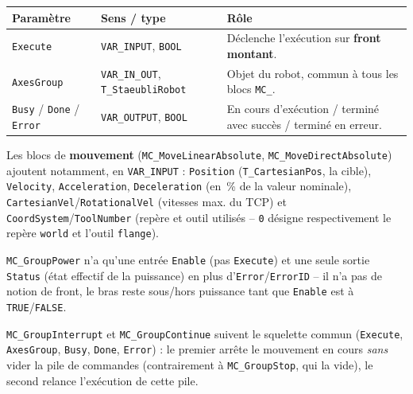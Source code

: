 \begin{center}
\begin{tabular}{|l|l|p{7.5cm}|}
\hline
\textbf{Paramètre} & \textbf{Sens / type} & \textbf{Rôle} \\
\hline
\texttt{Execute} & \texttt{VAR\_INPUT}, \texttt{BOOL} & Déclenche
l'exécution sur \textbf{front montant}. \\
\hline
\texttt{AxesGroup} & \texttt{VAR\_IN\_OUT}, \texttt{T\_StaeubliRobot} &
Objet du robot, commun à tous les blocs \texttt{MC\_}. \\
\hline
\texttt{Busy} / \texttt{Done} / \texttt{Error} & \texttt{VAR\_OUTPUT},
\texttt{BOOL} & En cours d'exécution / terminé avec succès / terminé en
erreur. \\
\hline
\end{tabular}
\end{center}

Les blocs de \textbf{mouvement} (\texttt{MC\_MoveLinearAbsolute},
\texttt{MC\_MoveDirectAbsolute}) ajoutent notamment, en \texttt{VAR\_INPUT} :
\texttt{Position} (\texttt{T\_CartesianPos}, la cible), \texttt{Velocity},
\texttt{Acceleration}, \texttt{Deceleration} (en~\% de la valeur
nominale), \texttt{CartesianVel}/\texttt{RotationalVel} (vitesses max. du
TCP) et \texttt{CoordSystem}/\texttt{ToolNumber} (repère et outil utilisés
-- \texttt{0} désigne respectivement le repère \texttt{world} et l'outil
\texttt{flange}).

\texttt{MC\_GroupPower} n'a qu'une entrée \texttt{Enable} (pas
\texttt{Execute}) et une seule sortie \texttt{Status} (état effectif de la
puissance) en plus d'\texttt{Error}/\texttt{ErrorID} -- il n'a pas de
notion de front, le bras reste sous/hors puissance tant que
\texttt{Enable} est à \texttt{TRUE}/\texttt{FALSE}.

\texttt{MC\_GroupInterrupt} et \texttt{MC\_GroupContinue} suivent le
squelette commun (\texttt{Execute}, \texttt{AxesGroup}, \texttt{Busy},
\texttt{Done}, \texttt{Error}) : le premier arrête le mouvement en cours
\emph{sans} vider la pile de commandes (contrairement à
\texttt{MC\_GroupStop}, qui la vide), le second relance l'exécution de
cette pile.


